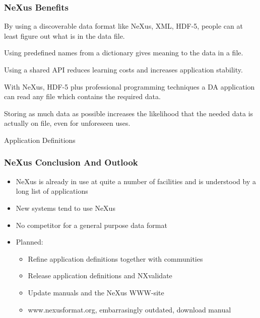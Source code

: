 \documentclass{beamer}
\begin{document}
\begin{frame} \frametitle{NeXus Benefits}
\begin{description}
\item<1->[Benefit 1] By using a discoverable data format like NeXus, XML, HDF-5, people can at 
 least figure out  what is in the data file. 
\item<2->[Benefit 2] Using predefined names from a dictionary gives meaning to the data in a file.
\item<3->[Benefit 3] Using a shared API reduces learning costs and increases application stability.
\item<4->[Benefit 4] With NeXus, HDF-5 plus professional programming techniques a DA application can 
 read any file which contains the required data.
\item<5->[Benefit 5] Storing as much data as possible increases the likelihood that the needed 
 data is actually on file, even for unforeseen uses. 
\item<6->[Benefit 6] Application Definitions
\end{description}
\end{frame}




\begin{frame} \frametitle{NeXus Conclusion And Outlook}
\begin{itemize}
\item NeXus is already in use at quite a number of facilities and is understood 
 by a long list of applications
\item New systems tend to use NeXus
\item No competitor for a general purpose data format
\item Planned:
\begin{itemize}
\item Refine application definitions together with communities
\item Release application definitions and NXvalidate
\item Update manuals and the NeXus WWW-site
\item www.nexusformat.org, embarrasingly outdated, download manual
\end{itemize}
\end{itemize}
\end{frame}
\end{document}
